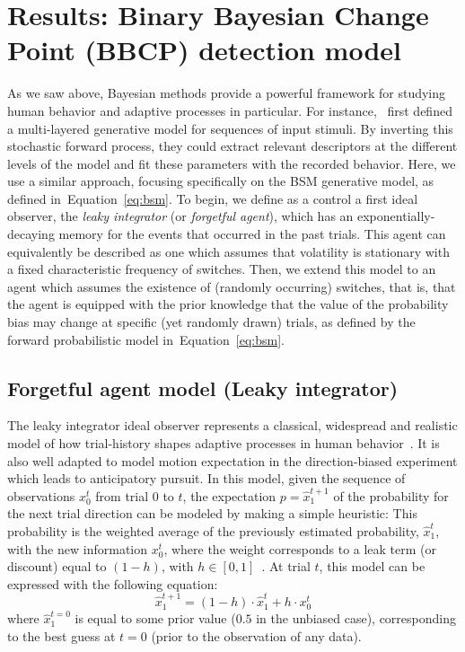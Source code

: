 \documentclass[10pt,letterpaper]{article}
\newcommand{\eql}[1]{\begin{equation}#1\end{equation}}
\newcommand{\citep}[1]{\cite{#1}}
\newcommand{\citet}[1]{\cite{#1}}
\newcommand{\seeEq}[1]{Equation~\ref{eq:#1}}
\begin{document}
\section{Results: Binary Bayesian Change Point (BBCP) detection model}
\label{sec:Bayesian_change_point}
%
%
As we saw above, Bayesian methods provide a powerful framework for studying human behavior and adaptive  processes in particular.
For instance,~\citet{Mathys11} first defined a multi-layered generative model for
sequences of input stimuli.
By inverting this stochastic forward process,
they could extract relevant descriptors at the different levels of the model
and fit these parameters with the recorded behavior.
Here, we use a similar approach, focusing specifically on the BSM generative model,
as defined in~\seeEq{bsm}.
To begin, we define as a control a first ideal observer, the \textit{leaky integrator} (or \textit{forgetful agent}),
which has an exponentially-decaying memory for the events that occurred in the past trials.
This agent can equivalently be described as one
which assumes that volatility is stationary with a fixed characteristic frequency of switches.
Then, we extend this model to an agent
which assumes the existence of (randomly occurring) switches, that is,
that the agent is equipped with the prior knowledge
that the value of the probability bias may change
at specific (yet randomly drawn) trials,
as defined by the forward probabilistic model in~\seeEq{bsm}.
%
\subsection{Forgetful agent model (Leaky integrator)}%
The leaky integrator ideal observer represents a classical, widespread and
realistic model of how trial-history shapes
adaptive processes in human behavior~\citet{Anderson2006}.
It is also well adapted to model motion expectation in the direction-biased experiment which leads to anticipatory pursuit.
In this model, given the sequence of observations $x_0^t$ from trial $0$ to $t$,
the expectation $p=\hat{x}_1^{t+1}$ of the probability for the next trial direction can be modeled by making a simple heuristic:
This probability is the weighted average of
the previously estimated probability, $\hat{x}_1^{t}$, with the new information $x_0^t$,
where the weight corresponds to a leak term (or discount)
equal to $(1 - h)$, with $h \in [0, 1]$~\citep{Anderson2006}.
At trial $t$, this model can be expressed with the following equation:
\eql{
\hat{x}_1^{t+1} = (1 - h) \cdot \hat{x}_1^{t} + h \cdot x_0^t
\label{eq:leaky}}
where $\hat{x}_1^{t=0}$ is equal to some prior value ($0.5$ in the unbiased case),
corresponding to the best guess at $t=0$ (prior to the observation of any data).
\end{document}
